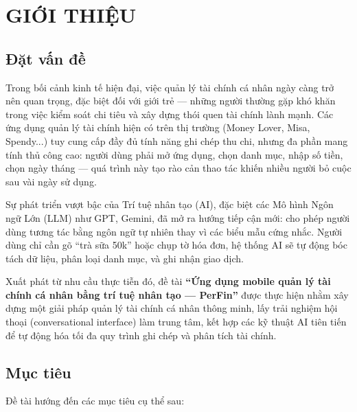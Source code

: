 \chapter{GIỚI THIỆU}
\label{ch:introduction}

\section{Đặt vấn đề}
\label{sec:problem_statement}

Trong bối cảnh kinh tế hiện đại, việc quản lý tài chính cá nhân ngày càng trở nên quan trọng, đặc biệt đối với giới trẻ --- những người thường gặp khó khăn trong việc kiểm soát chi tiêu và xây dựng thói quen tài chính lành mạnh. Các ứng dụng quản lý tài chính hiện có trên thị trường (Money Lover, Misa, Spendy...) tuy cung cấp đầy đủ tính năng ghi chép thu chi, nhưng đa phần mang tính thủ công cao: người dùng phải mở ứng dụng, chọn danh mục, nhập số tiền, chọn ngày tháng --- quá trình này tạo rào cản thao tác khiến nhiều người bỏ cuộc sau vài ngày sử dụng.

Sự phát triển vượt bậc của Trí tuệ nhân tạo (AI), đặc biệt các Mô hình Ngôn ngữ Lớn (LLM) như GPT, Gemini, đã mở ra hướng tiếp cận mới: cho phép người dùng tương tác bằng ngôn ngữ tự nhiên thay vì các biểu mẫu cứng nhắc. Người dùng chỉ cần gõ ``trà sữa 50k'' hoặc chụp tờ hóa đơn, hệ thống AI sẽ tự động bóc tách dữ liệu, phân loại danh mục, và ghi nhận giao dịch.

Xuất phát từ nhu cầu thực tiễn đó, đề tài \textbf{``Ứng dụng mobile quản lý tài chính cá nhân bằng trí tuệ nhân tạo --- PerFin''} được thực hiện nhằm xây dựng một giải pháp quản lý tài chính cá nhân thông minh, lấy trải nghiệm hội thoại (conversational interface) làm trung tâm, kết hợp các kỹ thuật AI tiên tiến để tự động hóa tối đa quy trình ghi chép và phân tích tài chính.

\section{Mục tiêu}
\label{sec:objectives}

Đề tài hướng đến các mục tiêu cụ thể sau:

